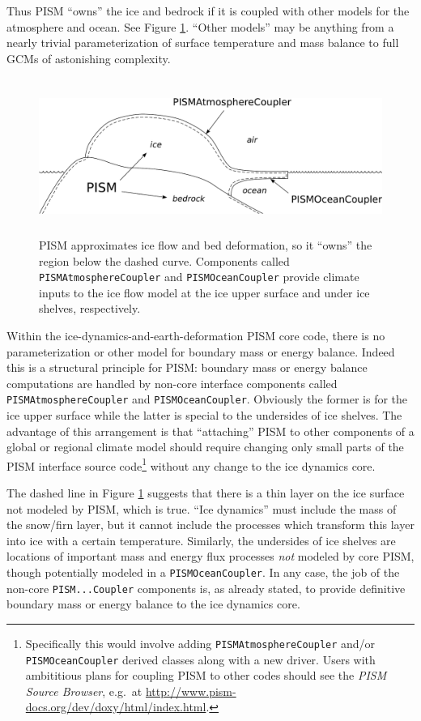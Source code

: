 \documentclass[11pt,final]{amsart}
\renewcommand{\t}[1]{\texttt{#1}}
\begin{document}
Thus PISM ``owns'' the ice and bedrock if it is coupled with other models for the atmosphere and ocean.  See Figure \ref{fig:climatecartoon}.  ``Other models'' may be anything from a nearly trivial parameterization of surface temperature and mass balance to full GCMs of astonishing complexity.

\begin{figure}[ht]
\vspace{0.2in}
\includegraphics[height=2.0in,keepaspectratio=true]{climate_cartoon}

\vspace{0.1in}
\caption{PISM approximates ice flow and bed deformation, so it ``owns'' the region below the dashed curve.  Components called \t{PISMAtmosphereCoupler} and \t{PISMOceanCoupler} provide climate inputs to the ice flow model at the ice upper surface and under ice shelves, respectively.}
\label{fig:climatecartoon}
\end{figure}

Within the ice-dynamics-and-earth-deformation PISM core code, there is no parameterization or other model for boundary mass or energy balance.  Indeed this is a structural principle for PISM: boundary mass or energy balance computations are handled by non-core interface components called \t{PISMAtmosphereCoupler} and \t{PISMOceanCoupler}.   Obviously the former is for the ice upper surface while the latter is special to the undersides of ice shelves.  The advantage of this arrangement is that ``attaching'' PISM to other components of a global or regional climate model should require changing only small parts of the PISM interface source code\footnote{Specifically this would involve adding \t{PISMAtmosphereCoupler} and/or \t{PISMOceanCoupler} derived classes along with a new driver.  Users with ambititious plans for coupling PISM to other codes should see the \emph{PISM Source Browser}, e.g.~at \url{http://www.pism-docs.org/dev/doxy/html/index.html}.} without any change to the ice dynamics core.

The dashed line in Figure \ref{fig:climatecartoon} suggests that there is a thin layer on the ice surface not modeled by PISM, which is true.  ``Ice dynamics'' must include the mass of the snow/firn layer, but it cannot include the processes which transform this layer into ice with a certain temperature.  Similarly, the undersides of ice shelves are locations of important mass and energy flux processes \emph{not} modeled by core PISM, though potentially modeled in a \t{PISMOceanCoupler}.  In any case, the job of the non-core \t{PISM...Coupler} components is, as already stated, to provide definitive boundary mass or energy balance to the ice dynamics core.
\end{document}
